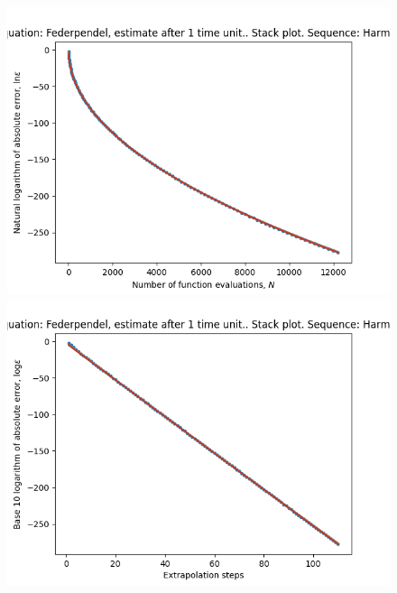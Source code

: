 \begin{figure}[H]
\centering
\begin{minipage}{0.45\textwidth}
\centering
\includegraphics[scale=0.45]{emr_plots/federpendel_1_hp_harmonic_stack.png}
\end{minipage}
\begin{minipage}{0.45\textwidth}
\centering
\includegraphics[scale=0.45]{emr_plots/federpendel_1_hp_harmonic_steps_stack.png}
\end{minipage}
\end{figure}

